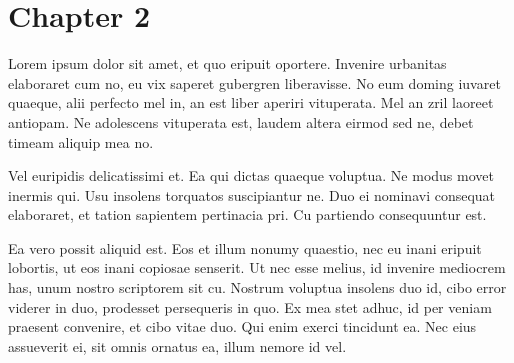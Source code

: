 \chapter{Chapter 2}
\label{chapter:maintext1}



Lorem ipsum dolor sit amet, et quo eripuit oportere. Invenire urbanitas elaboraret cum no, eu vix saperet gubergren liberavisse. No eum doming iuvaret quaeque, alii perfecto mel in, an est liber aperiri vituperata. Mel an zril laoreet antiopam. Ne adolescens vituperata est, laudem altera eirmod sed ne, debet timeam aliquip mea no.

Vel euripidis delicatissimi et. Ea qui dictas quaeque voluptua. Ne modus movet inermis qui. Usu insolens torquatos suscipiantur ne. Duo ei nominavi consequat elaboraret, et tation sapientem pertinacia pri. Cu partiendo consequuntur est.

Ea vero possit aliquid est. Eos et illum nonumy quaestio, nec eu inani eripuit lobortis, ut eos inani copiosae senserit. Ut nec esse melius, id invenire mediocrem has, unum nostro scriptorem sit cu. Nostrum voluptua insolens duo id, cibo error viderer in duo, prodesset persequeris in quo. Ex mea stet adhuc, id per veniam praesent convenire, et cibo vitae duo. Qui enim exerci tincidunt ea. Nec eius assueverit ei, sit omnis ornatus ea, illum nemore id vel.